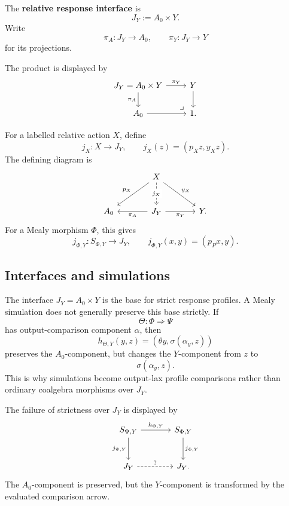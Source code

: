 \begin{definition}
\label{def:poly-relative-response-interface}
The \textbf{relative response interface} is
\[
J_Y:=A_0\times Y.
\]
Write
\[
\pi_A:J_Y\to A_0,
\qquad
\pi_Y:J_Y\to Y
\]
for its projections.
\end{definition}

The product is displayed by
\[
\begin{tikzcd}
J_Y=A_0\times Y
  \arrow[r,"\pi_Y"]
  \arrow[d,"\pi_A"']
&
Y
  \arrow[d]
\\
A_0
  \arrow[r]
&
1
\arrow[ul,phantom,very near start,"\lrcorner"] .
\end{tikzcd}
\]

For a labelled relative action \(X\), define
\[
j_X:X\to J_Y,
\qquad
j_X(z)=(p_Xz,y_Xz).
\]
The defining diagram is
\[
\begin{tikzcd}[column sep=large,row sep=large]
&
X
  \arrow[dl,"p_X"']
  \arrow[dr,"y_X"]
  \arrow[d,dashed,"j_X" description]
&
\\
A_0
&
J_Y
  \arrow[l,"\pi_A"]
  \arrow[r,"\pi_Y"']
&
Y .
\end{tikzcd}
\]
For a Mealy morphism \(\Phi\), this gives
\[
j_{\Phi,Y}:S_{\Phi,Y}\to J_Y,
\qquad
j_{\Phi,Y}(x,y)=(p_Px,y).
\]

\subsection{Interfaces and simulations}
\label{subsec:poly-relative-interface-simulations}

\begin{remark}
\label{rem:poly-relative-interface-and-simulations}
The interface \(J_Y=A_0\times Y\) is the base for strict response profiles.  A
Mealy simulation does not generally preserve this base strictly.  If
\[
\Theta:\Phi\Rightarrow\Psi
\]
has output-comparison component \(\alpha\), then
\[
h_{\Theta,Y}(y,z)
=
(\theta y,\sigma(\alpha_y,z))
\]
preserves the \(A_0\)-component, but changes the \(Y\)-component from \(z\) to
\[
\sigma(\alpha_y,z).
\]
This is why simulations become output-lax profile comparisons rather than
ordinary coalgebra morphisms over \(J_Y\).
\end{remark}

The failure of strictness over \(J_Y\) is displayed by
\[
\begin{tikzcd}[column sep=large,row sep=large]
S_{\Psi,Y}
  \arrow[r,"h_{\Theta,Y}"]
  \arrow[d,"j_{\Psi,Y}"']
&
S_{\Phi,Y}
  \arrow[d,"j_{\Phi,Y}"]
\\
J_Y
  \arrow[r,dashed,"?"]
&
J_Y .
\end{tikzcd}
\]
The \(A_0\)-component is preserved, but the \(Y\)-component is transformed by
the evaluated comparison arrow.

